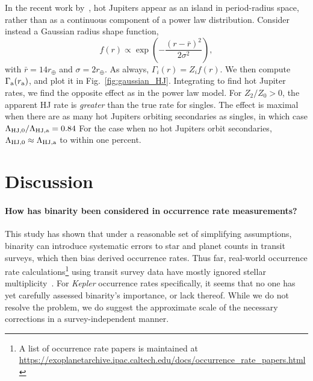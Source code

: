 \documentclass[12pt,modern]{aastex61}
\renewcommand{\a}{_{\rm a}}
\begin{document}
In the recent work by~\citet{petigura_CKS_2017}, hot Jupiters appear as an 
island in period-radius space, rather than as a continuous component of a 
power law distribution.
Consider instead a Gaussian radius shape function,
\begin{equation}
f(r) \propto \exp \left( -\frac{(r-\bar{r})^2}{2\sigma^2} \right),
\end{equation}
with $\bar{r} = 14r_\oplus$ and $\sigma = 2r_\oplus$.
As always, $\Gamma_i(r) = Z_i f(r)$.
We then compute $\Gamma\a(r\a)$, and plot it in Fig.~\ref{fig:gaussian_HJ}.
Integrating to find hot Jupiter rates,
we find the opposite effect as in the power law model.
For $Z_2/Z_0>0$, 
the apparent HJ rate is {\it greater} than the true rate for singles.
The effect is maximal when there are as many hot Jupiters orbiting secondaries 
as singles, in which case
$\Lambda_{{\rm HJ},0}/\Lambda_{\rm HJ,a} = 0.84$
For the case when no hot Jupiters orbit secondaries, $\Lambda_{{\rm HJ},0} 
\approx \Lambda_{\rm HJ,a}$ to within one percent.


%

\section{Discussion}
\label{sec:discussion}

\paragraph{How has binarity been considered in occurrence rate measurements?}
This study has shown that under a reasonable set of simplifying assumptions, 
binarity can introduce systematic errors to star and planet counts in transit 
surveys, which then bias derived occurrence rates.
Thus far, real-world occurrence rate calculations\footnote{
    A list of occurrence rate papers is maintained at 
    \url{https://exoplanetarchive.ipac.caltech.edu/docs/occurrence_rate_papers.html}
} using transit survey data have mostly ignored stellar 
multiplicity~\citep[\textit{e.g.},][]{howard_planet_2012,fressin_false_2013,foreman-mackey_exoplanet_2014,dressing_occurrence_2015,burke_terrestrial_2015}.
For {\it Kepler} occurrence rates specifically, 
it seems that no one has yet carefully assessed binarity's importance, or lack 
thereof.
While we do not resolve the problem, we do suggest the approximate scale of 
the necessary corrections in a survey-independent manner.
\end{document}
